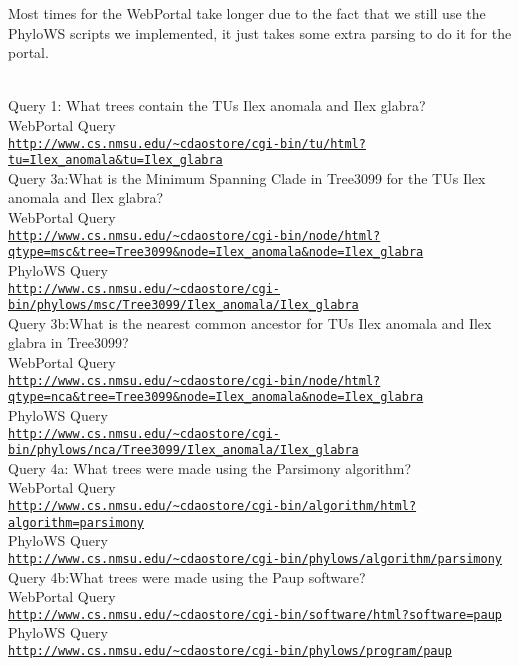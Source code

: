 \documentclass[10pt]{article}
\begin{document}
Most times for the WebPortal take longer due to the fact that we still use the PhyloWS scripts we implemented, it just takes some extra parsing to do it for the portal.

\\
Query 1: What trees contain the TUs Ilex anomala and Ilex glabra?
\\ WebPortal Query \\
{\tt \url{http://www.cs.nmsu.edu/~cdaostore/cgi-bin/tu/html?tu=Ilex_anomala&tu=Ilex_glabra}}
\\

Query 3a:What is the Minimum Spanning Clade in Tree3099 for the TUs Ilex anomala and Ilex glabra?\\
 WebPortal Query \\
{\tt \url{http://www.cs.nmsu.edu/~cdaostore/cgi-bin/node/html?qtype=msc&tree=Tree3099&node=Ilex_anomala&node=Ilex_glabra}}
\\PhyloWS Query\\
{\tt \url{http://www.cs.nmsu.edu/~cdaostore/cgi-bin/phylows/msc/Tree3099/Ilex_anomala/Ilex_glabra}}
\\

Query 3b:What is the nearest common ancestor for TUs Ilex anomala and Ilex glabra in Tree3099?\\
 WebPortal Query \\
{\tt \url{http://www.cs.nmsu.edu/~cdaostore/cgi-bin/node/html?qtype=nca&tree=Tree3099&node=Ilex_anomala&node=Ilex_glabra}}
\\PhyloWS Query\\
{\tt \url{http://www.cs.nmsu.edu/~cdaostore/cgi-bin/phylows/nca/Tree3099/Ilex_anomala/Ilex_glabra}}
\\

Query 4a: What trees were made using the Parsimony algorithm?
\\ WebPortal Query \\
{\tt \url{http://www.cs.nmsu.edu/~cdaostore/cgi-bin/algorithm/html?algorithm=parsimony}}
\\PhyloWS Query\\
{\tt \url{http://www.cs.nmsu.edu/~cdaostore/cgi-bin/phylows/algorithm/parsimony}}
\\

Query 4b:What trees were made using the Paup software?\\
 WebPortal Query \\
{\tt \url{http://www.cs.nmsu.edu/~cdaostore/cgi-bin/software/html?software=paup}}
\\PhyloWS Query\\
{\tt \url{http://www.cs.nmsu.edu/~cdaostore/cgi-bin/phylows/program/paup}}
\\
\end{document}

